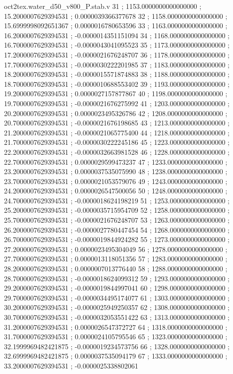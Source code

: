 \begin{filecontents}[overwrite]{oct2tex.water_d50_v800_P.stab.v}
31 ; 1153.0000000000000000 ; 15.2000007629394531 ; 0.0000039366377678
32 ; 1158.0000000000000000 ; 15.6999998092651367 ; 0.0000016780653596
33 ; 1163.0000000000000000 ; 16.2000007629394531 ; -0.0000014351151094
34 ; 1168.0000000000000000 ; 16.7000007629394531 ; -0.0000043041095523
35 ; 1173.0000000000000000 ; 17.2000007629394531 ; -0.0000021676248707
36 ; 1178.0000000000000000 ; 17.7000007629394531 ; -0.0000030222201985
37 ; 1183.0000000000000000 ; 18.2000007629394531 ; -0.0000015571874883
38 ; 1188.0000000000000000 ; 18.7000007629394531 ; -0.0000010688553402
39 ; 1193.0000000000000000 ; 19.2000007629394531 ; 0.0000027157877867
40 ; 1198.0000000000000000 ; 19.7000007629394531 ; -0.0000021676275992
41 ; 1203.0000000000000000 ; 20.2000007629394531 ; 0.0000023495326786
42 ; 1208.0000000000000000 ; 20.7000007629394531 ; -0.0000021676198685
43 ; 1213.0000000000000000 ; 21.2000007629394531 ; -0.0000021065775400
44 ; 1218.0000000000000000 ; 21.7000007629394531 ; -0.0000030222245186
45 ; 1223.0000000000000000 ; 22.2000007629394531 ; -0.0000032663981528
46 ; 1228.0000000000000000 ; 22.7000007629394531 ; 0.0000029599473237
47 ; 1233.0000000000000000 ; 23.2000007629394531 ; 0.0000037535075990
48 ; 1238.0000000000000000 ; 23.7000007629394531 ; 0.0000021053579076
49 ; 1243.0000000000000000 ; 24.2000007629394531 ; 0.0000026547500056
50 ; 1248.0000000000000000 ; 24.7000007629394531 ; -0.0000018624198219
51 ; 1253.0000000000000000 ; 25.2000007629394531 ; -0.0000035715954709
52 ; 1258.0000000000000000 ; 25.7000007629394531 ; -0.0000021676248707
53 ; 1263.0000000000000000 ; 26.2000007629394531 ; -0.0000027780447454
54 ; 1268.0000000000000000 ; 26.7000007629394531 ; -0.0000019844924282
55 ; 1273.0000000000000000 ; 27.2000007629394531 ; 0.0000023495304049
56 ; 1278.0000000000000000 ; 27.7000007629394531 ; 0.0000013118051356
57 ; 1283.0000000000000000 ; 28.2000007629394531 ; 0.0000007013776440
58 ; 1288.0000000000000000 ; 28.7000007629394531 ; -0.0000018624099312
59 ; 1293.0000000000000000 ; 29.2000007629394531 ; -0.0000019844997041
60 ; 1298.0000000000000000 ; 29.7000007629394531 ; -0.0000034495174077
61 ; 1303.0000000000000000 ; 30.2000007629394531 ; -0.0000025949250357
62 ; 1308.0000000000000000 ; 30.7000007629394531 ; -0.0000032053551422
63 ; 1313.0000000000000000 ; 31.2000007629394531 ; 0.0000026547372727
64 ; 1318.0000000000000000 ; 31.7000007629394531 ; 0.0000024105795546
65 ; 1323.0000000000000000 ; 32.1999969482421875 ; -0.0000019234573756
66 ; 1328.0000000000000000 ; 32.6999969482421875 ; 0.0000037535094179
67 ; 1333.0000000000000000 ; 33.2000007629394531 ; -0.0000025338802061

\end{filecontents}
